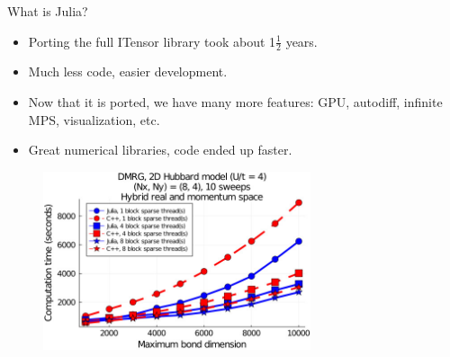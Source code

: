 \begin{frame}{What is Julia?}

\begin{itemize}[<+->]

  \item Porting the full ITensor library took about 1$\frac{1}{2}$ years.
  \item Much less code, easier development.
  \item Now that it is ported, we have many more features: GPU, autodiff, infinite MPS, visualization, etc.
  \item Great numerical libraries, code ended up faster.

\end{itemize}

\begin{figure}[T]
  \includegraphics[width=0.7\textwidth]{
    slides/assets/what-is-julia-itensor-benchmark.jpg
  }
\end{figure}

\end{frame}
